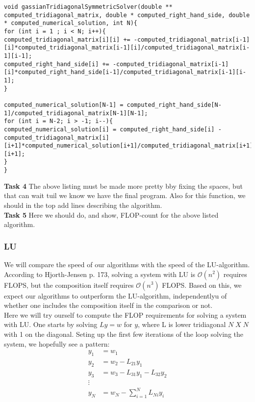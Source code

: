 \documentclass{article}
\begin{document}
\begin{lstlisting}
void gassianTridiagonalSymmetricSolver(double ** computed_tridiagonal_matrix, double * computed_right_hand_side, double * computed_numerical_solution, int N){
for (int i = 1 ; i < N; i++){
computed_tridiagonal_matrix[i][i] += -computed_tridiagonal_matrix[i-1][i]*computed_tridiagonal_matrix[i-1][i]/computed_tridiagonal_matrix[i-1][i-1];
computed_right_hand_side[i] += -computed_tridiagonal_matrix[i-1][i]*computed_right_hand_side[i-1]/computed_tridiagonal_matrix[i-1][i-1];
}

computed_numerical_solution[N-1] = computed_right_hand_side[N-1]/computed_tridiagonal_matrix[N-1][N-1];
for (int i = N-2; i > -1; i--){
computed_numerical_solution[i] = computed_right_hand_side[i] - computed_tridiagonal_matrix[i][i+1]*computed_numerical_solution[i+1]/computed_tridiagonal_matrix[i+1][i+1];
}
}
\end{lstlisting}

\textbf{Task 4} The above listing must be made more pretty bby fixing the spaces, but that can wait tuil we know we have the final program. Also for this function, we should in the top add lines describing the algorithm.\\

\textbf{Task 5} Here we should do, and show, FLOP-count for the above listed algorithm.

\subsubsection{LU}
We will compare the speed of our algorithms with the speed of the LU-algorithm. According to Hjorth-Jensen \cite{MHJ} p. 173, solving a system with LU is $\mathcal{O}(n^2)$ requires FLOPS, but the composition itself requires  $\mathcal{O}(n^3)$ FLOPS. Based on this, we expect our algorithms to outperform the LU-algorithm, independentlyu of whether one includes the composition itself in the comparison or not.\\

Here we will try ourself to compute the FLOP requirements for solving a system with LU. One starts by solving $Ly = w$ for $y$, where L is lower tridiagonal $N\; X\; N$ with 1 on the diagonal. Seting up the first few iterations of the loop solving the system, we hopefully see a pattern:
\begin{align}
y_1 &= w_1\\
y_2 &= w_2 - L_{21} y_1\\
y_3 &= w_3 - L_{31} y_1 - L_{32}y_2\\
\vdots\\
y_{N}& = w_N - \sum_{i=1}^{N} L_{Ni} y_i
\end{align}
\end{document}
